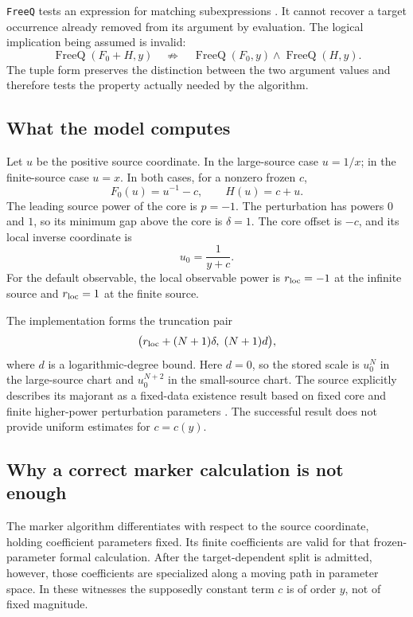 \documentclass[11pt,letterpaper]{article}
\theoremstyle{remark}\newtheorem{remark}[theorem]{Remark}
\newcommand{\code}[1]{\texttt{#1}}
\begin{document}
\code{FreeQ} tests an expression for matching subexpressions
\cite{freeq}. It cannot recover a target occurrence already removed from its
argument by evaluation. The logical implication being assumed is invalid:
\begin{equation}\label{eq:invalidimplication}
 \operatorname{FreeQ}(F_0+H,y)
 \quad\not\Rightarrow\quad
 \operatorname{FreeQ}(F_0,y)\land\operatorname{FreeQ}(H,y).
\end{equation}
The tuple form preserves the distinction between the two argument values and
therefore tests the property actually needed by the algorithm.

\subsection{What the model computes}
Let $u$ be the positive source coordinate. In the large-source case $u=1/x$;
in the finite-source case $u=x$. In both cases, for a nonzero frozen $c$,
\[
 F_0(u)=u^{-1}-c,\qquad H(u)=c+u.
\]
The leading source power of the core is $p=-1$. The perturbation has powers
$0$ and $1$, so its minimum gap above the core is $\delta=1$. The core offset
is $-c$, and its local inverse coordinate is
\begin{equation}\label{eq:corecoordinate}
 u_0=\frac1{y+c}.
\end{equation}
For the default observable, the local observable power is $r_{\rm loc}=-1$
at the infinite source and $r_{\rm loc}=1$ at the finite source.

The implementation forms the truncation pair
\begin{equation}\label{eq:sourcebound}
 \bigl(r_{\rm loc}+(N+1)\delta,\;(N+1)d\bigr),
\end{equation}
where $d$ is a logarithmic-degree bound. Here $d=0$, so the stored scale is
$u_0^N$ in the large-source chart and $u_0^{N+2}$ in the small-source chart.
The source explicitly describes its majorant as a fixed-data existence result
based on fixed core and finite higher-power perturbation parameters
\cite{core}. The successful result does not provide uniform estimates for
$c=c(y)$.

\subsection{Why a correct marker calculation is not enough}
The marker algorithm differentiates with respect to the source coordinate,
holding coefficient parameters fixed. Its finite coefficients are valid for
that frozen-parameter formal calculation. After the target-dependent split is
admitted, however, those coefficients are specialized along a moving path in
parameter space. In these witnesses the supposedly constant term $c$ is of
order $y$, not of fixed magnitude.
\end{document}
